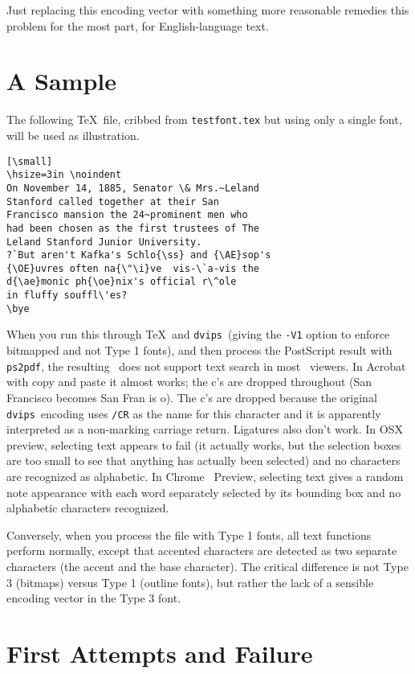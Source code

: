\documentclass{ltugboat}
\def\PDF{\acro{PDF}}
\def\dvips{\texttt{dvips}}
\def\ps2pdf{\texttt{ps2pdf}}
\begin{document}
Just replacing this encoding vector with something more
reasonable remedies this problem for the most part, for
English-language text.

\section{A Sample}

The following \TeX\ file, cribbed from \texttt{testfont.tex}
but using only a single font, will be used as illustration.

\begin{verbatim}[\small]
\hsize=3in \noindent
On November 14, 1885, Senator \& Mrs.~Leland
Stanford called together at their San
Francisco mansion the 24~prominent men who
had been chosen as the first trustees of The
Leland Stanford Junior University.
?`But aren't Kafka's Schlo{\ss} and {\AE}sop's
{\OE}uvres often na{\"\i}ve  vis-\`a-vis the
d{\ae}monic ph{\oe}nix's official r\^ole
in fluffy souffl\'es?
\bye
\end{verbatim}
\noindent
When you run this through \TeX\ and \dvips\
(giving the \texttt{-V1} option to enforce bitmapped
and not Type 1 fonts), and then process the PostScript
result with \ps2pdf, the resulting \PDF\ does not
support text search in most \PDF\ viewers.  In Acrobat
with copy and paste it almost works;
the c's are dropped throughout (San Francisco becomes
San Fran is o).  The c's are dropped because the
original \dvips\ encoding uses \texttt{/CR} as the
name for this character and it is apparently
interpreted as a non-marking carriage return.
Ligatures also don't work.  In OSX
preview, selecting text appears to fail (it
actually works, but the selection boxes are too small
to see that anything has actually been selected) and
no characters are recognized as alphabetic.  In Chrome
\PDF\ Preview, selecting text gives a random note
appearance with each word separately selected by its
bounding box and no alphabetic characters recognized.

Conversely, when you process the file with Type 1
fonts, all text functions perform normally, except that
accented characters are detected as two separate
characters (the accent and the base character).  The
critical difference is not Type 3 (bitmaps) versus
Type 1 (outline fonts), but rather the lack of a
sensible encoding vector in the Type 3 font.

\section{First Attempts and Failure}
\end{document}
